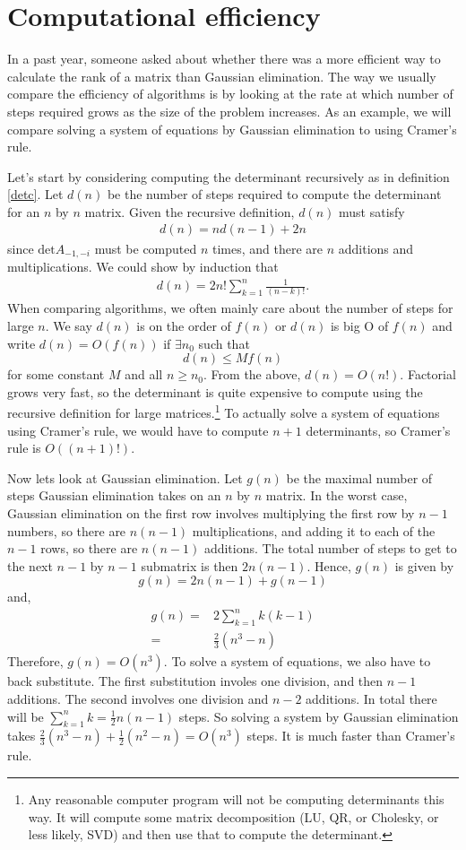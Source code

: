 \documentclass[12pt,reqno]{amsart}
\renewcommand{\det}{\mathrm{det}}
\theoremstyle{definition}
\begin{document}
\section{Computational efficiency}
In a past year, someone asked about whether there was a more efficient
way to calculate the rank of a matrix than Gaussian elimination. The
way we usually compare the efficiency of algorithms is by looking at
the rate at which number of steps required grows as the size of the
problem increases. As an example, we will compare solving a system of
equations by Gaussian elimination to using Cramer's rule.

Let's start by considering computing the determinant
recursively as in definition \ref{detc}. Let $d(n)$ be the number of
steps required to compute the determinant for an $n$ by $n$
matrix. Given the recursive definition, $d(n)$ must satisfy
\begin{align*}
  d(n) = n d(n-1) + 2n 
\end{align*}
since $\det A_{-1,-i}$ must be computed $n$ times, and there are $n$
additions and multiplications. We could show by induction that
\begin{align*}
  d(n) = 2n! \sum_{k=1}^n \frac{1}{(n-k)!} .
\end{align*}
When comparing algorithms, we often mainly care about the number of
steps for large $n$. We say $d(n)$ is on the order of $f(n)$ or $d(n)$
is big O of $f(n)$ and write $d(n) = O(f(n))$ if $\exists n_0$ such
that
\[
  d(n) \leq M f(n) 
\]
for some constant $M$ and all $n \geq n_0$. From the above, $d(n) =
O(n!)$. Factorial grows very fast, so the determinant is quite
expensive to compute using the recursive definition for large
matrices.\footnote{Any reasonable computer program will not be
  computing determinants this way. It will compute some matrix
  decomposition (LU, QR, or Cholesky, or less likely, SVD) and then
  use that to compute the determinant.} To actually solve a system of
equations using Cramer's rule, we would have to compute $n+1$
determinants, so Cramer's rule is $O((n+1)!)$.

Now lets look at Gaussian elimination. Let $g(n)$ be the maximal
number of steps Gaussian elimination takes on an $n$ by $n$ matrix. In
the worst case, Gaussian elimination on the first row involves multiplying
the first row by $n-1$ numbers, so there are $n(n-1)$ multiplications,
and adding it to each of the $n-1$ rows, so there are $n(n-1)$
additions. The total number of steps to get to the next $n-1$ by $n-1$
submatrix is then $2n(n-1)$. Hence, $g(n)$ is given by
\[ g(n) = 2n(n-1) + g(n-1) \]
and,
\begin{align*}
  g(n) = & 2 \sum_{k=1}^n k(k-1) \\
  = & \frac{2}{3} (n^3 - n)
\end{align*}
Therefore, $g(n) = O(n^3)$. To solve a system of equations, we also
have to back substitute. The first substitution involes one division,
and then $n-1$ additions. The second involves one division and $n-2$
additions. In total there will be $\sum_{k=1}^n k = \frac{1}{2}
n(n-1)$ steps. So solving a system by Gaussian elimination takes 
$\frac{2}{3} (n^3 - n) + \frac{1}{2}(n^2 - n) = O(n^3)$ steps. It is
much faster than Cramer's rule. 
\end{document}

